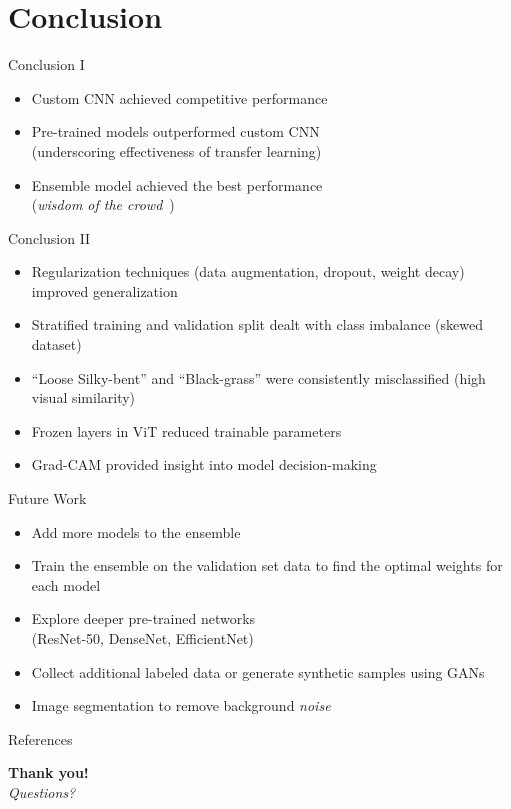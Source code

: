 \documentclass{beamer}
\begin{document}
\section{Conclusion}
\begin{frame}{Conclusion I}
    \begin{itemize}
        \item Custom CNN achieved competitive performance
        \item Pre-trained models outperformed custom CNN\\(underscoring effectiveness of transfer learning)
        \item Ensemble model achieved the best performance\\(\textit{wisdom of the crowd}~\cite[Chapter~7]{geronoctober2022hands})
    \end{itemize}
\end{frame}

\begin{frame}{Conclusion II}
    \begin{itemize}
        \item Regularization techniques (data augmentation, dropout, weight decay) improved generalization
        \item Stratified training and validation split dealt with class imbalance (skewed dataset)
        \item ``Loose Silky-bent'' and ``Black-grass'' were consistently misclassified (high visual similarity)
        \item Frozen layers in ViT reduced trainable parameters
        \item Grad-CAM provided insight into model decision-making
    \end{itemize}
\end{frame}

\begin{frame}{Future Work}
    \begin{itemize}
        \item Add more models to the ensemble
        \item Train the ensemble on the validation set data to find the optimal weights for each model
        \item Explore deeper pre-trained networks\\(ResNet-50, DenseNet, EfficientNet)
        \item Collect additional labeled data or generate synthetic samples using GANs~\cite{goodfellow2014generativeadversarialnetworks}
        \item Image segmentation to remove background \textit{noise}
    \end{itemize}
\end{frame}

\begin{frame}{References}
    \sloppy
    \printbibliography
\end{frame}

\begin{frame}
    \begin{center}
        \Huge
        \textbf{Thank you!}\\
        \vspace{1cm}
        \textit{Questions?}
    \end{center}
\end{frame}
\end{document}
